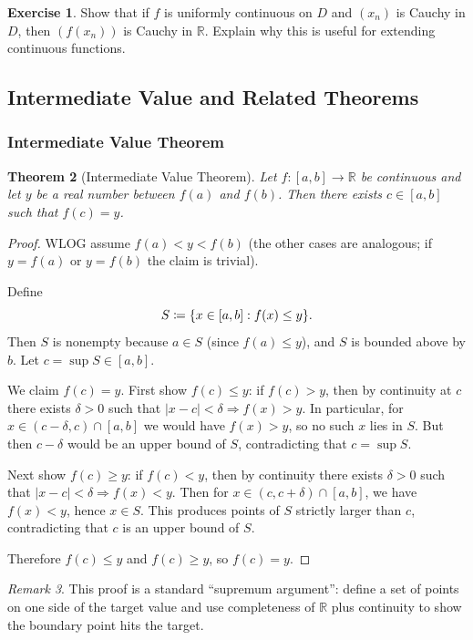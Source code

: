 \documentclass[12pt]{article}
\numberwithin{equation}{section}
\def\abs#1{|#1|}
\newcommand{\RR}{\mathbb{R}}
\DeclarePairedDelimiter{\abs}{\lvert}{\rvert}
\DeclarePairedDelimiter{\set}{\{}{\}}
\theoremstyle{plain}
\newtheorem{theorem}{Theorem}[section]
\theoremstyle{definition}
\newtheorem{exercise}[theorem]{Exercise}
\theoremstyle{remark}
\newtheorem{remark}[theorem]{Remark}
\begin{document}
\begin{exercise}
Show that if $f$ is uniformly continuous on $D$ and $(x_n)$ is Cauchy in $D$, then $(f(x_n))$ is Cauchy in $\RR$.
Explain why this is useful for extending continuous functions.
\end{exercise}

\newpage

\subsection{Intermediate Value and Related Theorems}

\subsubsection{Intermediate Value Theorem}

\begin{theorem}[Intermediate Value Theorem]\label{thm:ivt}
Let $f:[a,b]\to\RR$ be continuous and let $y$ be a real number between $f(a)$ and $f(b)$.
Then there exists $c\in[a,b]$ such that $f(c)=y$.
\end{theorem}

\begin{proof}
WLOG assume $f(a)<y<f(b)$ (the other cases are analogous; if $y=f(a)$ or $y=f(b)$ the claim is trivial).

Define
\[
S \coloneqq \set{x\in[a,b]: f(x)\le y}.
\]
Then $S$ is nonempty because $a\in S$ (since $f(a)\le y$), and $S$ is bounded above by $b$.
Let $c=\sup S\in[a,b]$.

We claim $f(c)=y$.
First show $f(c)\le y$:
if $f(c)>y$, then by continuity at $c$ there exists $\delta>0$ such that $\abs{x-c}<\delta \Rightarrow f(x)>y$.
In particular, for $x\in (c-\delta,c)\cap[a,b]$ we would have $f(x)>y$, so no such $x$ lies in $S$.
But then $c-\delta$ would be an upper bound of $S$, contradicting that $c=\sup S$.

Next show $f(c)\ge y$:
if $f(c)<y$, then by continuity there exists $\delta>0$ such that $\abs{x-c}<\delta \Rightarrow f(x)<y$.
Then for $x\in(c,c+\delta)\cap[a,b]$, we have $f(x)<y$, hence $x\in S$.
This produces points of $S$ strictly larger than $c$, contradicting that $c$ is an upper bound of $S$.

Therefore $f(c)\le y$ and $f(c)\ge y$, so $f(c)=y$.
\end{proof}

\begin{remark}
This proof is a standard ``supremum argument'': define a set of points on one side of the target value and use completeness of $\RR$ plus continuity to show the boundary point hits the target.
\end{remark}
\end{document}
